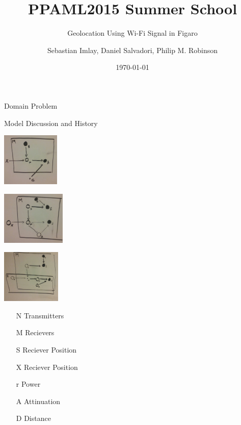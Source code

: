 \documentclass[11pt]{beamer}
\begin{document}
\title{PPAML2015 Summer School}

\subtitle{Geolocation Using Wi-Fi Signal in Figaro}

\author{Sebastian Imlay, Daniel Salvadori, Philip M. Robinson}


\date{\today}

\begin{frame}
  \titlepage
\end{frame}


\begin{frame}{Domain Problem}

\end{frame}

\begin{frame}{Model Discussion and History}
\begin{center}
\begin{multicols}{3}
\includegraphics[height=1in]{pictures/1plate.jpg}

\columnbreak

\includegraphics[height=1in]{pictures/2plate.jpg}

\columnbreak

\includegraphics[height=1in]{pictures/3plate.jpg}

\columnbreak
\end{multicols}
\end{center}
\begin{itemize}
\item[N] Transmitters
\item[M] Recievers
\item[S] Reciever Position
\item[X] Reciever Position
\item[r] Power
\item[A] Attinuation
\item[D] Distance
\end{itemize}

\end{frame}
\end{document}
